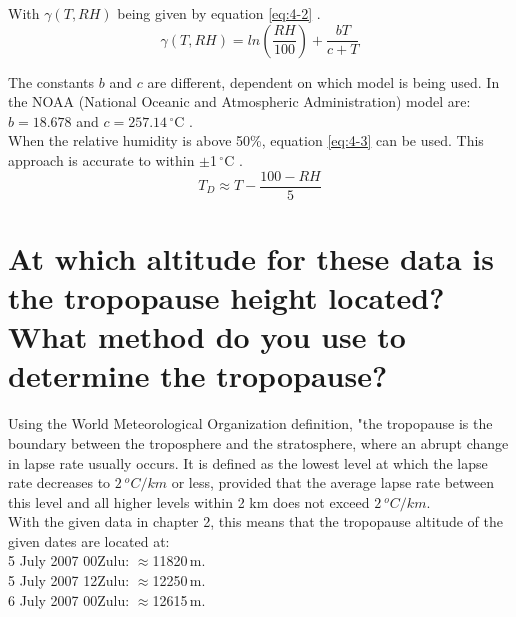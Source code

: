 \documentclass{article}
\begin{document}
With $\gamma (T, RH)$ being given by equation \ref{eq:4-2} \cite{wikiQ4}.
\begin{equation}
\gamma (T, RH) = ln \left( \frac{RH}{100} \right) + \frac{bT}{c + T} \label{eq:4-2}
\end{equation}

The constants $b$ and $c$ are different, dependent on which model is being used. In the NOAA (National Oceanic and Atmospheric Administration) model are: $b = 18.678$ and $c = 257.14$\,$^\circ$C \cite{wikiQ4}.\\

When the relative humidity is above 50\%, equation \ref{eq:4-3} can be used. This approach is accurate to within $\pm$1\,$^\circ$C \cite{wikiQ4}.
\begin{equation}
T_D \approx T - \frac{100 - RH}{5} \label{eq:4-3}
\end{equation}



\newpage
\section{At which altitude for these data is the tropopause height located?What method do you use to determine the tropopause?}
Using the World Meteorological Organization definition, "the tropopause is the boundary between the troposphere and the stratosphere, where an abrupt change in lapse rate usually occurs. It is defined as the lowest level at which the lapse rate decreases to $2 \ ^{o}C/km$ or less, provided that the average lapse rate between this level and all higher levels within 2 km does not exceed $2 \  ^{o}C/km$.\\


With the given data in chapter 2, this means that the tropopause altitude of the given dates are located at:\\
5 July 2007 00Zulu: $\approx$11820\,m.\\
5 July 2007 12Zulu: $\approx$12250\,m.\\
6 July 2007 00Zulu: $\approx$12615\,m.\\

\newpage
\end{document}
